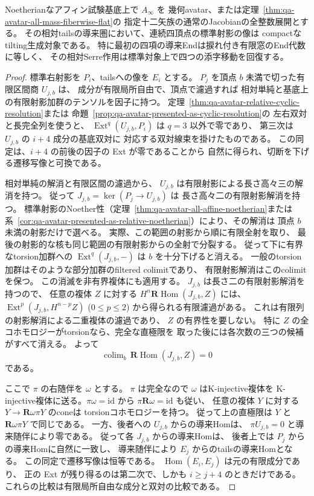 \begin{theorem}[全幾何avatarの相対tailsにおける有限窓の回復]
\label{thm:qa-avatar-all-tails-tilting}
Noetherianなアフィン試験基底上で $A_{\infty}$ を
幾何avatar、または定理~\ref{thm:qa-avatar-all-mass-fiberwise-flat}の
指定十二矢族の通常のJacobianの全整数展開とする。
その相対tailsの導来圏において、連続四頂点の標準射影の像は
compactなtilting生成対象である。
特に最初の四項の導来Endは捩れ付き有限窓のEnd代数に等しく、
その相対Serre作用は標準対象上で四つの添字移動を回復する。
\end{theorem}
\begin{proof}
標準右射影を $P_i$、tailsへの像を $E_i$ とする。
$P_j$ を頂点 $b$ 未満で切った有限区間商 $U_{j,b}$ は、
成分が有限局所自由で、頂点で濾過すれば
相対単純と基底上の有限射影加群のテンソルを因子に持つ。
定理~\ref{thm:qa-avatar-relative-cyclic-resolution}または
命題~\ref{prop:qa-avatar-presented-as-cyclic-resolution}の
左右双対と長完全列を使うと、
$\operatorname{Ext}^q(U_{j,b},P_i)$ は $q=3$ 以外で零であり、
第三次は $U_{j,b}$ の $i+4$ 成分の基底双対に
対応する双対線束を掛けたものである。
この同定は、$i+4$ の前後の因子の Ext が零であることから
自然に得られ、切断を下げる遷移写像と可換である。

相対単純の解消と有限区間の濾過から、
$U_{j,b}$ は有限射影による長さ高々三の解消を持つ。
従って $J_{j,b}=\ker(P_j\to U_{j,b})$ は
長さ高々二の有限射影解消を持つ。
標準射影のNoether性（定理~\ref{thm:qa-avatar-all-affine-noetherian}または
系~\ref{cor:qa-avatar-presented-as-relative-noetherian}）により、その解消は
頂点 $b$ 未満の射影だけで選べる。
実際、この範囲の射影から順に有限全射を取り、
最後の射影的な核も同じ範囲の有限射影からの全射で分裂する。
従って下に有界なtorsion加群への
$\operatorname{Ext}^q(J_{j,b},-)$ は $b$ を十分下げると消える。
一般のtorsion加群はそのような部分加群のfiltered colimitであり、
有限射影解消はこのcolimitを保つ。
この消滅を非有界複体にも適用する。
$J_{j,b}$ は長さ二の有限射影解消を持つので、
任意の複体 $Z$ に対する
$H^n\mathbf R\operatorname{Hom}(J_{j,b},Z)$ には、
$\operatorname{Ext}^p(J_{j,b},H^{n-p}Z)$ ($0\le p\le 2$)
から得られる有限濾過がある。
これは有限列の射影解消による二重複体の濾過であり、
$Z$ の有界性を要しない。
特に $Z$ の全コホモロジーがtorsionなら、完全な直極限を
取った後には各次数の三つの候補がすべて消える。
よって
\[
 \mathop{\mathrm{colim}}_b\,
 \mathbf R\operatorname{Hom}(J_{j,b},Z)=0
\]
である。

ここで $\pi$ の右随伴を $\omega$ とする。
$\pi$ は完全なので $\omega$ はK-injective複体を
K-injective複体に送る。$\pi\omega=\mathrm{id}$ から
$\pi\mathbf R\omega=\mathrm{id}$ も従い、
任意の複体 $Y$ に対する
$Y\to\mathbf R\omega\pi Y$ のconeは
torsionコホモロジーを持つ。
従って上の直極限は $Y$ と $\mathbf R\omega\pi Y$ で同じである。
一方、後者への $U_{j,b}$ からの導来Homは、
$\pi U_{j,b}=0$ と導来随伴により零である。
従って各 $J_{j,b}$ からの導来Homは、
後者上では $P_j$ からの導来Homに自然に一致し、
導来随伴により $E_j$ からのtailsの導来Homとなる。
この同定で遷移写像は恒等である。
$\operatorname{Hom}(E_i,E_j)$ は元の有限成分であり、
正の Ext が残り得るのは第二次で、しかも $i\ge j+4$ のときだけである。
これらの比較は有限局所自由な成分と双対の比較である。


\end{proof}
